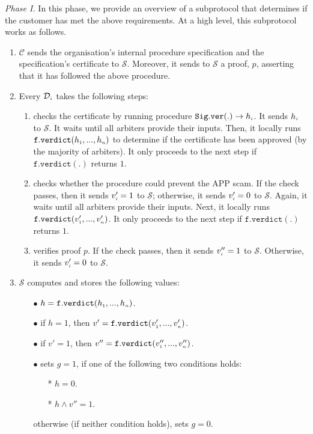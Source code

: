 \noindent\textit{{Phase I.}} In this phase, we provide an overview of a  subprotocol that determines if the customer has met the above requirements. At a high level, this subprotocol works as follows.


 \begin{enumerate}[label=(\Alph*)]
\item\label{C-side} $\mathcal{C}$ sends the organisation's internal procedure specification and the specification's certificate  to  $\mathcal{S}$. Moreover,   it sends to $\mathcal{S}$  a proof, $p$, asserting that it has followed the above procedure. 

\item\label{D-side} Every  $\mathcal{D}_{\scriptscriptstyle i}$ takes the following steps:
 
 \begin{enumerate}
 \item checks the certificate by running procedure $\mathtt{Sig.ver}(.)\rightarrow h_{\scriptscriptstyle i}$. It sends $h_{\scriptscriptstyle i}$ to $\mathcal{S}$. It waits until all arbiters provide their inputs. Then, it locally runs $\mathtt{f.verdict}(h_{\scriptscriptstyle 1},...,h_{\scriptscriptstyle n})$ to determine if the certificate has been approved (by the majority of arbiters). It only proceeds to the next step if $\mathtt{f.verdict}(.)$ returns $1$.  
%
 \item\label{subprotocol::evaluate-procedure}  checks whether the  procedure could prevent the APP scam. If the check passes, then it sends $v'_{\scriptscriptstyle i}=1$  to $\mathcal{S}$; otherwise, it sends $v'_{\scriptscriptstyle i}=0$  to $\mathcal{S}$. Again, it waits until all arbiters provide their inputs. Next, it locally runs $\mathtt{f.verdict}(v'_{\scriptscriptstyle 1},...,v'_{\scriptscriptstyle n})$. It only proceeds to the next step if $\mathtt{f.verdict}(.)$ returns $1$.
 \item verifies  proof $p$. If the check passes, then it sends $v''_{\scriptscriptstyle i}=1$  to $\mathcal{S}$. Otherwise, it sends $v'_{\scriptscriptstyle i}=0$  to $\mathcal{S}$.
 
 \end{enumerate} 
 
\item\label{S-side} $\mathcal{S}$ computes and stores the following values:
  \begin{itemize}
  \item [$\bullet$] $h=\mathtt{f.verdict}(h_{\scriptscriptstyle 1},...,h_{\scriptscriptstyle n})$.
  \item [$\bullet$] if $h=1$, then $v'=\mathtt{f.verdict}(v'_{\scriptscriptstyle 1},...,v'_{\scriptscriptstyle n})$.
  \item [$\bullet$] if $v'=1$, then $v''=\mathtt{f.verdict}(v''_{\scriptscriptstyle 1},...,v''_{\scriptscriptstyle n})$.
   \item [$\bullet$] sets $g=1$, if one of the  following two conditions holds:  
   
   \begin{itemize}
   \item[*]  $h=0$.
   \item[*]   $h\wedge v'' =1$.
  \end{itemize}
 otherwise (if neither condition holds), sets $g=0$. 
   \end{itemize} 
 \end{enumerate} 
 
